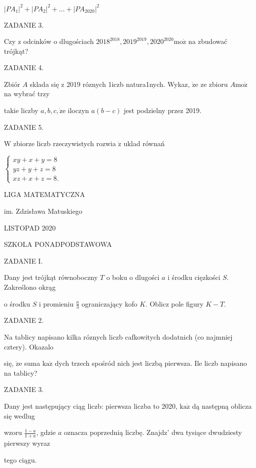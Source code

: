 \documentclass[a4paper,12pt]{article}
\begin{document}
$|PA_{1}|^{2}+|PA_{2}|^{2}+\ldots+|PA_{2020}|^{2}$

ZADANIE 3.

Czy z odcinków o dlugościach $2018^{2018}, 2019^{2019}, 2020^{2020}\mathrm{m}\mathrm{o}\dot{\mathrm{z}}$ na zbudować trójkąt?

ZADANIE 4.

Zbiór $A$ sklada się z 2019 róznych 1iczb natura1nych. Wykaz, $\dot{\mathrm{z}}\mathrm{e}$ ze zbioru $A\mathrm{m}\mathrm{o}\dot{\mathrm{z}}$ na wybrać trzy

takie liczby $a, b, c, \dot{\mathrm{z}}\mathrm{e}$ iloczyn $a(b-c)$ jest podzielny przez 2019.

ZADANIE 5.

$\mathrm{W}$ zbiorze liczb rzeczywistych rozwia $\dot{\mathrm{z}}$ uklad równań

$\left\{\begin{array}{l}
xy+x+y=8\\
yz+y+z=8\\
xz+x+z=8.
\end{array}\right.$






LIGA MATEMATYCZNA

im. Zdzisława Matuskiego

LISTOPAD 2020

SZKOLA PONADPODSTAWOWA

ZADANIE I.

Dany jest trójkąt równoboczny $T$ o boku o dlugości $a$ i środku cięzkości $S$. Zakreślono okrąg

o środku $S$ i promieniu $\displaystyle \frac{a}{3}$ ograniczający kofo $K$. Oblicz pole figury $K-T.$

ZADANIE 2.

Na tablicy napisano kilka róznych liczb cafkowitych dodatnich (co najmniej cztery). Okazalo

się, $\dot{\mathrm{z}}\mathrm{e}$ suma $\mathrm{k}\mathrm{a}\dot{\mathrm{z}}$ dych trzech spośród nich jest liczbą pierwsza. Ile liczb napisano na tablicy?

ZADANIE 3.

Dany jest następujący ciąg liczb: pierwsza liczba to 2020, $\mathrm{k}\mathrm{a}\dot{\mathrm{z}}$ dą następną oblicza się wedlug

wzoru $\displaystyle \frac{1-a}{1+a}$, gdzie $a$ oznacza poprzednią liczbę. Znajdz' dwa tysiące dwudziesty pierwszy wyraz

tego ciągu.
\end{document}

